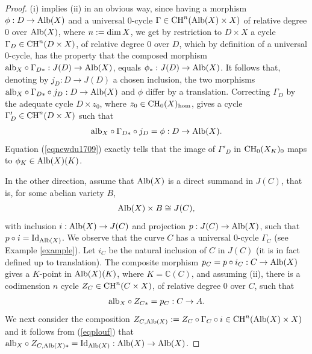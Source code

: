 \documentclass[10pt]{article}
\begin{document}
\begin{proof}   (i) implies  (ii) in an obvious way, since having a morphism $\phi: D\rightarrow {\rm Alb}(X)$ and a universal $0$-cycle $\Gamma\in {\rm CH}^n({\rm Alb}(X)\times X)$ of relative degree $0$ over ${\rm Alb}(X)$, where $n:={\rm dim}\,X$, we get by restriction to $D\times X$ a cycle
$\Gamma_D\in {\rm CH}^n(D\times X)$, of relative degree $0$ over $D$, which by definition of  a universal $0$-cycle, has the property that the composed morphism ${\rm alb}_X\circ \Gamma_{D*}:J(D)\rightarrow {\rm Alb}(X)$, equals $\phi_*:J(D)\rightarrow {\rm Alb}(X)$. It follows that, denoting by $j_D:D\rightarrow J(D)$ a chosen  inclusion, the two morphisms
${\rm alb}_X\circ \Gamma_{D*} \circ j_D: D\rightarrow {\rm Alb}(X)$ and $\phi$ differ by  a translation. Correcting $\Gamma_D$ by the adequate cycle $D\times z_0$, where $z_0\in{\rm CH}_0(X)_{\rm hom}$, gives a cycle $\Gamma'_D\in {\rm CH}^n(D\times X)$ such that
\begin{eqnarray}\label{eqnewdu1709} {\rm alb}_X\circ \Gamma_{D*} \circ j_D = \phi: D\rightarrow {\rm Alb}(X).
\end{eqnarray}
Equation (\ref{eqnewdu1709}) exactly tells that the image of $\Gamma'_D$ in ${\rm CH}_0(X_{K})_0$ maps to $\phi_K\in{\rm Alb}(X)(K)$.

In the other direction, assume that ${\rm Alb}(X)$ is a direct summand in $J(C)$, that is, for some abelian variety $B$,
$$ {\rm Alb}(X)\times B\cong J(C),$$ with inclusion $i:{\rm Alb}(X)\rightarrow J(C)$ and projection $p:J(C)\rightarrow {\rm Alb}(X)$, such that $p\circ i={\rm Id}_{{\rm Alb}(X)}$. We observe that the curve $C$ has a universal $0$-cycle $\Gamma_C$ (see Example \ref{example}).
Let $i_C$ be the natural inclusion of $C$ in $J(C)$ (it is in fact defined up to translation). The composite morphism $p_C=p\circ i_C: C\rightarrow {\rm Alb}(X)$ gives a $K$-point in ${\rm Alb}(X)(K)$, where $K=\mathbb{C}(C)$, and assuming (ii), there is a codimension $n$ cycle $Z_C\in{\rm CH}^n(C\times X)$, of relative degree $0$ over $C$, such that
\begin{eqnarray}\label{eqplouf}{\rm alb}_X\circ Z_{C*}=p_C: C\rightarrow A.\end{eqnarray}
 We next consider the composition $Z_{C,{\rm Alb}(X)}:=Z_C\circ \Gamma_C\circ i\in {\rm CH}^n({\rm Alb}(X)\times X)$ and it follows from  (\ref{eqplouf}) that ${\rm alb}_X\circ Z_{C,{\rm Alb}(X)*}={\rm Id}_{{\rm Alb}(X)}:{\rm Alb}(X)\rightarrow {\rm Alb}(X)$.
\end{proof}
\end{document}
